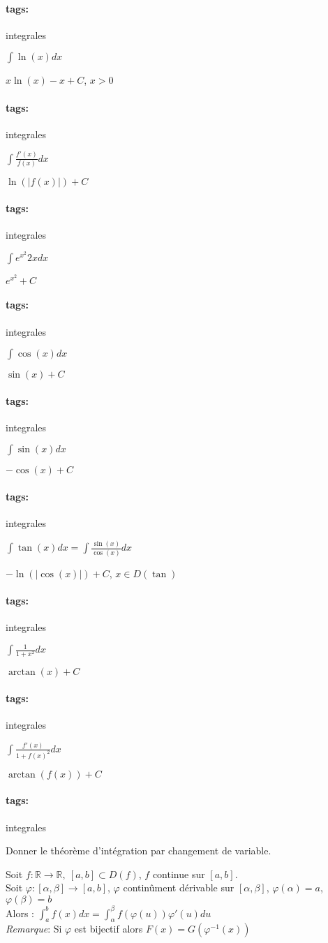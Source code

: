 \documentclass[12pt]{article}
\newcommand*{\xfield}[1]{\begin{mdframed}\centering #1\end{mdframed}\bigskip}
\newenvironment{note}{}{}
\newcommand*{\tags}[1]{\paragraph{tags: }#1}
\begin{document}
\begin{note}
\begin{note}
	\tags{integrales}
	\xfield{$\int \ln(x) dx$}
	\xfield{$x\ln(x)-x+C$, $x>0$}
\end{note}

\begin{note}
	\tags{integrales}
	\xfield{$\int \frac{f'(x)}{f(x)} dx$}
	\xfield{$\ln(\vert f(x) \vert ) +C$}
\end{note}

\begin{note}
	\tags{integrales}
	\xfield{$\int e^{x^2}2x dx$}
	\xfield{$e^{x^2}+C$}
\end{note}

\begin{note}
	\tags{integrales}
	\xfield{$\int \cos(x) dx$}
	\xfield{$\sin(x) +C$}
\end{note}

\begin{note}
	\tags{integrales}
	\xfield{$\int \sin(x) dx$}
	\xfield{$-\cos(x) +C$}
\end{note}

\begin{note}
	\tags{integrales}
	\xfield{$\int \tan(x)  dx =\int \frac{\sin(x)}{\cos(x)} dx$}
	\xfield{$-\ln(\vert \cos(x) \vert ) + C$, $x \in D(\tan)$}
\end{note}

\begin{note}
	\tags{integrales}
	\xfield{$\int \frac{1}{1+x^2} dx$}
	\xfield{$\arctan(x) + C$}
\end{note}

\begin{note}
	\tags{integrales}
	\xfield{$\int \frac{f'(x)}{1+f(x)^2} dx$}
	\xfield{$\arctan(f(x)) +C$}
\end{note}


\begin{note}
	\tags{integrales}
	\xfield{Donner le théorème d'intégration par changement de variable.}
	\xfield{Soit $f: \mathbb{R} \to \mathbb{R},\ [a,b] \subset D(f)$, $f$ continue sur $[a,b]$.\\
	Soit $\varphi : [\alpha,\beta] \to [a,b]$, $\varphi$ continûment dérivable sur $[\alpha,\beta]$, $\varphi(\alpha) = a$, $\varphi(\beta) = b$\\
	Alors : $\int_a^b f(x) dx = \int_\alpha^\beta f(\varphi(u))\varphi'(u) du$\\
	\emph{Remarque}: Si $\varphi$ est bijectif alors $F(x) = G(\varphi^{-1}(x))$ }
\end{note}


\end{note}
\end{document}
